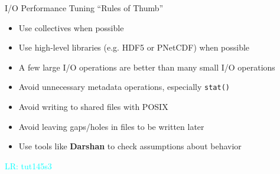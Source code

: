 \documentclass[compress,11pt,xcolor=svgnames,aspectratio=169]{beamer}
\newcommand{\lr}[1]{\textcolor{cyan}{LR: #1}}
\begin{document}
\begin{frame}[fragile] {I/O Performance Tuning ``Rules of Thumb''}

\begin{itemize}
\setlength\itemsep{0.3cm}

  \item Use collectives when possible

  \item Use high-level libraries (e.g. HDF5 or PNetCDF) when possible

  \item A few large I/O operations are better than many small I/O operations

  \item Avoid unnecessary metadata operations, especially \texttt{stat()}

  \item Avoid writing to shared files with POSIX

  \item Avoid leaving gaps/holes in files to be written later

  \item Use tools like \textbf{Darshan} to check assumptions about behavior

\end{itemize}


\lr{tut145s3}

\end{frame}
\end{document}

